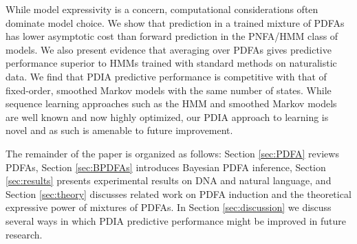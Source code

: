 While model expressivity is a concern, computational considerations often dominate model choice.  We show that prediction in a trained mixture of PDFAs has lower asymptotic cost than forward prediction in the PNFA/HMM class of models.  We also present evidence that averaging over PDFAs gives predictive performance superior to HMMs trained with standard methods on naturalistic data.  We find that PDIA predictive performance is competitive with that of fixed-order, smoothed Markov models with the same number of states.  While sequence learning approaches such as the HMM and smoothed Markov models are well known and now highly optimized, our PDIA approach to learning is novel and as such is amenable to future improvement.  

The remainder of the paper is organized as follows:  Section \ref{sec:PDFA} reviews PDFAs, Section \ref{sec:BPDFAs} introduces Bayesian PDFA inference, Section \ref{sec:results} presents experimental results on DNA and natural language, and Section \ref{sec:theory} discusses related work on PDFA induction and the theoretical expressive power of mixtures of PDFAs.
In Section \ref{sec:discussion} we discuss several ways in which PDIA predictive performance might be improved in future research.

